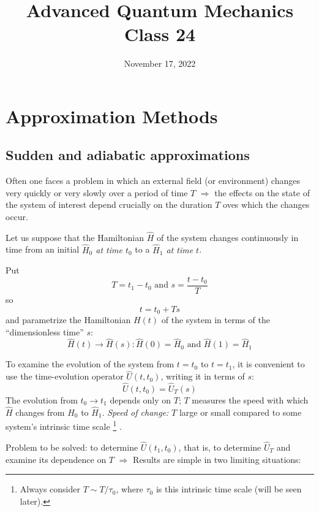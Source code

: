 \documentclass[12pt]{article}
\title{Advanced Quantum Mechanics\\Class 24}
\date{November 17, 2022}                                           %
\newcommand{\be}{\begin{equation}}
\newcommand{\ee}{\end{equation}}
\begin{document}
\maketitle

\setcounter{section}{6}

\section{Approximation Methods}


\setcounter{subsection}{2}
\subsection{Sudden and adiabatic approximations}

Often one faces a problem in which an
external field (or environment) changes
very quickly or very slowly over a
period of time $T$
$\Rightarrow$
the effects on the state of the system of
interest depend crucially on the
duration $T$ oves which the changes occur.

Let us suppose that the Hamiltonian $\hat{H}$ of the
system changes continuously in time from an
initial \emph{$\hat{H}_{0}$ at time $t_{0}$} to a \emph{$\hat{H}_{1}$ at time $t$}.

Put
\be
T=t_{1}-t_{0} \text { and } s=\frac{t-t_{0}}{T}
\ee
so
\be
t = t_0  +Ts
\ee
and parametrize the Hamiltonian $H(t)$ of the system
in terms of the ``dimensionless time'' $s$:
\be
\hat{H}(t) \rightarrow \hat{H}(s): \hat{H}(0)=\hat{H}_{0} \text{ and } \hat{H}(1)=\hat{H}_{1}
\ee


To examine the evolution of the system from $t=t_{0}$
to $t=t_{1}$, it is convenient to use the time-evolution
operator $\hat{U}\left(t, t_{0}\right)$, writing it in terms of $s$:
\be
\hat{U}\left(t, t_{0}\right)=\hat{U}_{T}(s)
\ee
The evolution from $t_{0} \rightarrow t_{1}$ depends only on $T$;
$T$ measures the speed with which $\hat{H}$ changes from $\hat{H}_{0}$ to $\hat{H}_{1}$.
\emph{Speed of change:} $T$ large or small compared to some
system's intrinsic time scale%
\footnote{Always consider $T\sim T/\tau_0$, where $\tau_0$ is this intrinsic time scale (will be seen later).}%
.

Problem to be solved: to determine $\hat{U}\left(t_{1}, t_{0}\right)$,
that is, to determine $\hat{U}_{T}$ and examine its dependence on $T$
$\Rightarrow$ Results are simple in two limiting situations:
\end{document}
